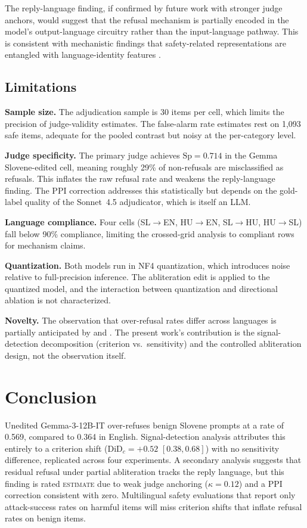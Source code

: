 \documentclass[11pt,letterpaper]{article}
\begin{document}
The reply-language finding, if confirmed by future work with stronger judge anchors, would suggest that the refusal mechanism is partially encoded in the model's output-language circuitry rather than the input-language pathway. This is consistent with mechanistic findings that safety-related representations are entangled with language-identity features \citep{Upadhyaya2026, Miao2026}.

\subsection{Limitations}

\textbf{Sample size.} The adjudication sample is 30 items per cell, which limits the precision of judge-validity estimates. The false-alarm rate estimates rest on 1,093 safe items, adequate for the pooled contrast but noisy at the per-category level.

\textbf{Judge specificity.} The primary judge achieves $\text{Sp} = 0.714$ in the Gemma Slovene-edited cell, meaning roughly 29\% of non-refusals are misclassified as refusals. This inflates the raw refusal rate and weakens the reply-language finding. The PPI correction addresses this statistically but depends on the gold-label quality of the Sonnet~4.5 adjudicator, which is itself an LLM.

\textbf{Language compliance.} Four cells (SL$\to$EN, HU$\to$EN, SL$\to$HU, HU$\to$SL) fall below 90\% compliance, limiting the crossed-grid analysis to compliant rows for mechanism claims.

\textbf{Quantization.} Both models run in NF4 quantization, which introduces noise relative to full-precision inference. The abliteration edit is applied to the quantized model, and the interaction between quantization and directional ablation is not characterized.

\textbf{Novelty.} The observation that over-refusal rates differ across languages is partially anticipated by \citet{Im2026} and \citet{Zhang2025}. The present work's contribution is the signal-detection decomposition (criterion vs.\ sensitivity) and the controlled abliteration design, not the observation itself.

\section{Conclusion}

Unedited Gemma-3-12B-IT over-refuses benign Slovene prompts at a rate of 0.569, compared to 0.364 in English. Signal-detection analysis attributes this entirely to a criterion shift ($\text{DiD}_c = +0.52$ $[0.38, 0.68]$) with no sensitivity difference, replicated across four experiments. A secondary analysis suggests that residual refusal under partial abliteration tracks the reply language, but this finding is rated \textsc{estimate} due to weak judge anchoring ($\kappa = 0.12$) and a PPI correction consistent with zero. Multilingual safety evaluations that report only attack-success rates on harmful items will miss criterion shifts that inflate refusal rates on benign items.



\end{document}
